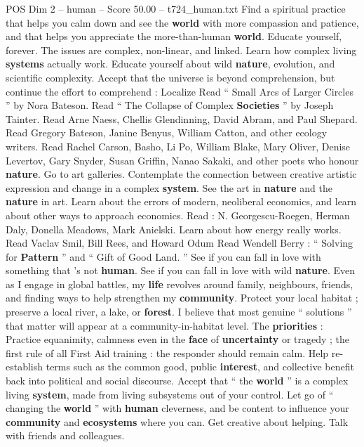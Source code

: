 \begin{textsample}{POS Dim 2 – human – Score 50.00 – t724\_human.txt}
Find a spiritual practice that helps you calm down and see the \textbf{world} with more compassion and patience, and that helps you appreciate the more-than-human \textbf{world}.
Educate yourself, forever.
The issues are complex, non-linear, and linked.
Learn how complex living \textbf{systems} actually work.
Educate yourself about wild \textbf{nature}, evolution, and scientific complexity.
Accept that the universe is beyond comprehension, but continue the effort to comprehend : Localize Read “ Small Arcs of Larger Circles ” by Nora Bateson.
Read “ The Collapse of Complex \textbf{Societies} ” by Joseph Tainter.
Read Arne Naess, Chellis Glendinning, David Abram, and Paul Shepard.
Read Gregory Bateson, Janine Benyus, William Catton, and other ecology writers.
Read Rachel Carson, Basho, Li Po, William Blake, Mary Oliver, Denise Levertov, Gary Snyder, Susan Griffin, Nanao Sakaki, and other poets who honour \textbf{nature}.
Go to art galleries.
Contemplate the connection between creative artistic expression and change in a complex \textbf{system}.
See the art in \textbf{nature} and the \textbf{nature} in art.
Learn about the errors of modern, neoliberal economics, and learn about other ways to approach economics.
Read : N.
Georgescu-Roegen, Herman Daly, Donella Meadows, Mark Anielski.
Learn about how energy really works.
Read Vaclav Smil, Bill Rees, and Howard Odum Read Wendell Berry : “ Solving for \textbf{Pattern} ” and “ Gift of Good Land. ” See if you can fall in love with something that ’s not \textbf{human}.
See if you can fall in love with wild \textbf{nature}.
Even as I engage in global battles, my \textbf{life} revolves around family, neighbours, friends, and finding ways to help strengthen my \textbf{community}.
Protect your local habitat ; preserve a local river, a lake, or \textbf{forest}.
I believe that most genuine “ solutions ” that matter will appear at a community-in-habitat level.
The \textbf{priorities} : Practice equanimity, calmness even in the \textbf{face} of \textbf{uncertainty} or tragedy ; the first rule of all First Aid training : the responder should remain calm.
Help re-establish terms such as the common good, public \textbf{interest}, and collective benefit back into political and social discourse.
Accept that “ the \textbf{world} ” is a complex living \textbf{system}, made from living subsystems out of your control.
Let go of “ changing the \textbf{world} ” with \textbf{human} cleverness, and be content to influence your \textbf{community} and \textbf{ecosystems} where you can.
Get creative about helping.
Talk with friends and colleagues.

\end{textsample}
